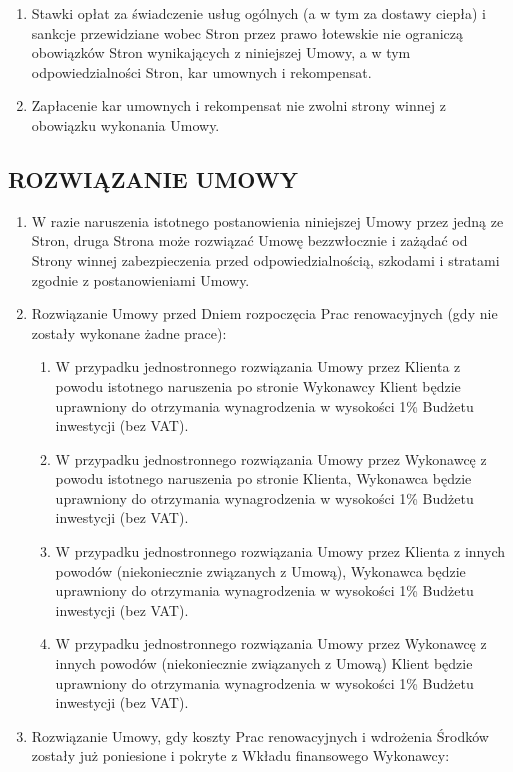 \begin{multicols}{2}
\begin{enumerate}
	\item Stawki opłat za świadczenie usług ogólnych (a w tym za dostawy ciepła) i sankcje przewidziane wobec Stron przez prawo łotewskie nie ograniczą obowiązków Stron wynikających z niniejszej Umowy, a w tym odpowiedzialności Stron, kar umownych i rekompensat.
	\item Zapłacenie kar umownych i rekompensat nie zwolni strony winnej z obowiązku wykonania Umowy.
\end{enumerate}

\subsection{ROZWIĄZANIE UMOWY}
\begin{enumerate}
	\item W razie naruszenia istotnego postanowienia niniejszej Umowy przez jedną ze Stron, druga Strona może rozwiązać Umowę bezzwłocznie i zażądać od Strony winnej zabezpieczenia przed odpowiedzialnością, szkodami i stratami zgodnie z postanowieniami Umowy.
	\item Rozwiązanie Umowy przed Dniem rozpoczęcia Prac renowacyjnych (gdy nie zostały wykonane żadne prace):
	\begin{enumerate}
		\item W przypadku jednostronnego rozwiązania Umowy przez Klienta z powodu istotnego naruszenia po stronie Wykonawcy Klient będzie uprawniony do otrzymania wynagrodzenia w wysokości 1\% Budżetu inwestycji (bez VAT).
		\item W przypadku jednostronnego rozwiązania Umowy przez Wykonawcę z powodu istotnego naruszenia po stronie Klienta, Wykonawca będzie uprawniony do otrzymania wynagrodzenia w wysokości 1\% Budżetu inwestycji (bez VAT).
		\item W przypadku jednostronnego rozwiązania Umowy przez Klienta z innych powodów (niekoniecznie związanych z Umową), Wykonawca będzie uprawniony do otrzymania wynagrodzenia w wysokości 1\% Budżetu inwestycji (bez VAT).
		\item W przypadku jednostronnego rozwiązania Umowy przez Wykonawcę z innych powodów (niekoniecznie związanych z Umową) Klient będzie  uprawniony do otrzymania wynagrodzenia w wysokości 1\% Budżetu inwestycji (bez VAT).
	\end{enumerate}
	\item Rozwiązanie Umowy, gdy koszty Prac renowacyjnych i wdrożenia Środków zostały już poniesione i pokryte z Wkładu finansowego Wykonawcy:
	\begin{enumerate}

\end{enumerate}
\end{enumerate}
\end{multicols}
